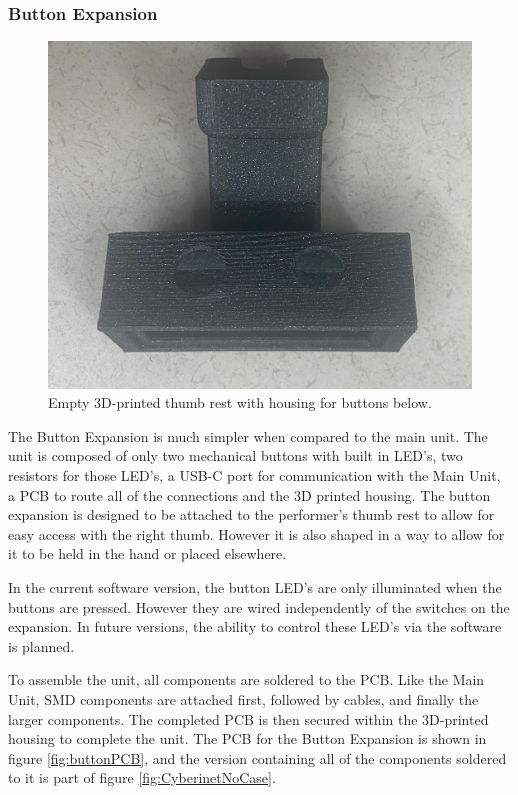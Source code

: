 \subsubsection{Button Expansion}

\begin{center}
    \begin{figure}
        \centering
        \includegraphics[scale=0.1]{diagrams/builtUnits/buttonhousingEmpty.JPG}
        \caption{Empty 3D-printed thumb rest with housing for buttons below.}
        \label{fig:buttonThumbrest}
    \end{figure}
\end{center}


The Button Expansion is much simpler when compared to the main unit. The unit is composed of only two mechanical buttons with built in LED's, two resistors for those LED's, a USB-C port for communication with the Main Unit, a PCB to route all of the connections and the 3D printed housing. The button expansion is designed to be attached to the performer's thumb rest to allow for easy access with the right thumb. However it is also shaped in a way to allow for it to be held in the hand or placed elsewhere.

In the current software version, the button LED's are only illuminated when the buttons are pressed. However they are wired independently of the switches on the expansion. In future versions, the ability to control these LED's via the software is planned.

To assemble the unit, all components are soldered to the PCB. Like the Main Unit, SMD components are attached first, followed by cables, and finally the larger components. The completed PCB is then secured within the 3D-printed housing to complete the unit. The PCB for the Button Expansion is shown in figure \ref{fig:buttonPCB}, and the version containing all of the components soldered to it is part of figure \ref{fig:CyberinetNoCase}.


